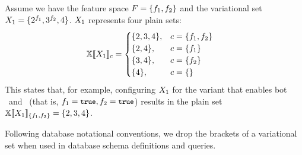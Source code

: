 \begin{example}
\label{eg:vset-conf}
Assume we have the feature space $\features = \setDef {\A, \B}$ 
and the variational set $\vset_1 = \setDef {\annot [\A] 2, \annot [\B] 3, 4}$.
$\vset_1$ represents four plain sets:
\begin{alignat*}{1}
\osetSem {\vset_1} &=
\begin{cases}
  \setDef{2,3,4}, & \config = \setDef{\A,\B}\\
  \setDef{2,4}, & \config = \setDef{\A}\\
  \setDef{3,4}, & \config = \setDef{\B}\\
  \setDef{4}, & \config = \setDef { }
\end{cases}
\end{alignat*}
This states that, for example, configuring $\vset_1$ for the variant that enables 
bot \A\ and \B\ (that is, \ensuremath{\A = \t, \B = \t}) results in the plain set
\ensuremath{ \osetSem [\setDef {\A, \B}] {\vset_1} = \setDef {2,3,4} }.
\end{example}

%
Following database notational conventions,
we drop the brackets of a variational set when used in database
schema definitions and queries.

